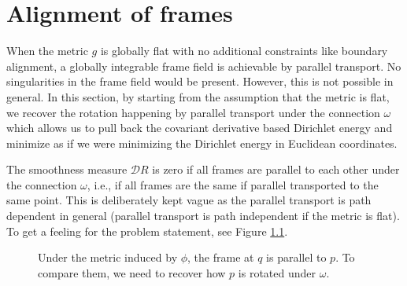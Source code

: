 \documentclass[../thesis.tex]{subfiles}
\begin{document}
\newcommand{\str}[1]{\textsc{#1}}
\newcommand{\var}[1]{\textit{#1}}
\def \ifempty#1{\def\temp{#1} \ifx\temp\empty }
\newcommand{\msg}[2]{\ensuremath{\ifempty{#2} [\str{#1}] \else [\str{#1}, {#2}] \fi}}
\newcommand{\tup}[1]{\ensuremath{\langle #1 \rangle}}
\newcommand{\nil}{\ensuremath{\bot}}
\newcommand{\false}{\textsc{false}\xspace}
\newcommand{\true}{\textsc{true}\xspace}

\newcommand\lastts{\var{lastts}\xspace}
\newcommand\nextts{\var{nextts}\xspace}
\newcommand\trusted{\var{trusted}\xspace}
\newcommand\newepoch{\var{newepoch}\xspace}
\newcommand\leader{\var{leader}\xspace}
\newcommand\ts{\var{ts}\xspace}
\newcommand{\CK}{\ensuremath{\mathcal{K}}\xspace}
\newcommand{\CP}{\ensuremath{\mathcal{P}}\xspace}
\newcommand{\CQ}{\ensuremath{\mathcal{Q}}\xspace}


\chapter{Alignment of frames}
\label{ch:calculation}
When the metric $g$ is globally flat with no additional constraints like
boundary alignment, a globally integrable frame field is achievable
by parallel transport. No singularities in the frame field would be present.
However, this is not possible in general.
In this section, by starting from the assumption that the metric
is flat, we recover the rotation happening by parallel transport under
the connection $\omega$ which allows us
to pull back the covariant derivative based Dirichlet energy
and minimize as if we were minimizing
the Dirichlet energy in Euclidean coordinates.

The smoothness measure $\mathcal{D}R$ is zero if all frames are parallel
to each other under the connection $\omega$, i.e., if all frames
are the same if parallel transported to the same point.
This is deliberately kept vague as the parallel transport is path
dependent in general (parallel transport is path independent if the metric is flat).
To get a feeling for the problem statement, see Figure \ref{fig:rotation}.

\begin{figure}[htb]
  \centering
  \def\svgwidth{20em}
  
  \caption{Under the metric induced by $\phi$, the frame at $q$ is parallel to $p$.
  To compare them, we need to recover how $p$ is rotated under $\omega$.}
  \label{fig:rotation}
\end{figure}
\end{document}
